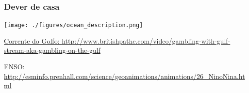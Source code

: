 \begin{frame}
  \frametitle{Dever de casa}
  \begin{center}
    \texttt{[image: ./figures/ocean\_description.png]}
  \end{center}

\scriptsize{

\href{http://www.britishpathe.com/video/gambling-with-gulf-stream-aka-gambling-on-the-gulf}{Corrente do Golfo: \url{http://www.britishpathe.com/video/gambling-with-gulf-stream-aka-gambling-on-the-gulf}}

\href{http://esminfo.prenhall.com/science/geoanimations/animations/26_NinoNina.html}{ENSO: \url{http://esminfo.prenhall.com/science/geoanimations/animations/26_NinoNina.html}}

}
\end{frame}


